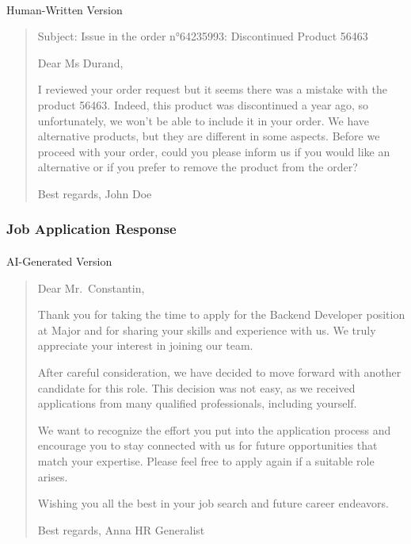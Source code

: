 \documentclass[
]{article}
\makeatletter
\let\oldparagraph\paragraph
\renewcommand{\paragraph}{
    \@ifstar
      \xxxParagraphStar
      \xxxParagraphNoStar
  }
\newcommand{\xxxParagraphStar}[1]{\oldparagraph*{#1}\mbox{}}
\newcommand{\xxxParagraphNoStar}[1]{\oldparagraph{#1}\mbox{}}
\makeatother
\begin{document}
\paragraph{Human-Written Version}\label{human-written-version-1}

\begin{quote}
Subject: Issue in the order n°64235993: Discontinued Product 56463

Dear Ms Durand,

I reviewed your order request but it seems there was a mistake with the
product 56463. Indeed, this product was discontinued a year ago, so
unfortunately, we won't be able to include it in your order. We have
alternative products, but they are different in some aspects. Before we
proceed with your order, could you please inform us if you would like an
alternative or if you prefer to remove the product from the order?

Best regards, John Doe
\end{quote}

\subsubsection{Job Application Response}\label{job-application-response}

\paragraph{AI-Generated Version}\label{ai-generated-version-2}

\begin{quote}
Dear Mr.~Constantin,

Thank you for taking the time to apply for the Backend Developer
position at Major and for sharing your skills and experience with us. We
truly appreciate your interest in joining our team.

After careful consideration, we have decided to move forward with
another candidate for this role. This decision was not easy, as we
received applications from many qualified professionals, including
yourself.

We want to recognize the effort you put into the application process and
encourage you to stay connected with us for future opportunities that
match your expertise. Please feel free to apply again if a suitable role
arises.

Wishing you all the best in your job search and future career endeavors.

Best regards, Anna HR Generalist
\end{quote}
\end{document}
